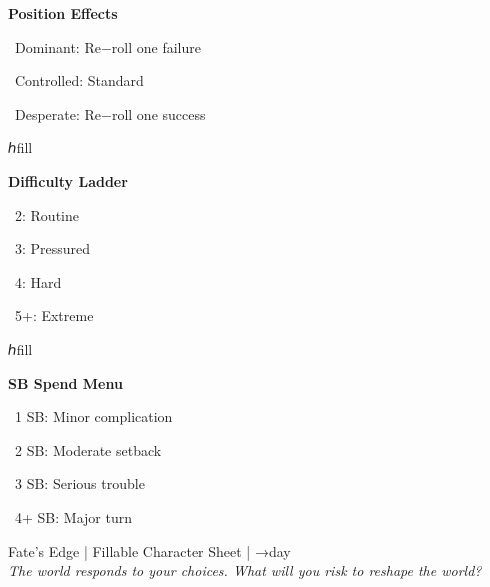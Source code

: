 \documentclass[10pt]{article}
\begin{document}
\begin{minipage}[t]{0.32\textwidth}
  \textbf{Position Effects}
  
  \textbullet~Dominant: Re−roll one failure
  
  \textbullet~Controlled: Standard
  
  \textbullet~Desperate: Re−roll one success
\end{minipage}
ℎfill
\begin{minipage}[t]{0.32\textwidth}
  \textbf{Difficulty Ladder}
  
  \textbullet~2: Routine
  
  \textbullet~3: Pressured
  
  \textbullet~4: Hard
  
  \textbullet~5+: Extreme
\end{minipage}
ℎfill
\begin{minipage}[t]{0.32\textwidth}
  \textbf{SB Spend Menu}
  
  \textbullet~1 SB: Minor complication
  
  \textbullet~2 SB: Moderate setback
  
  \textbullet~3 SB: Serious trouble
  
  \textbullet~4+ SB: Major turn
\end{minipage}

\vspace{0.5cm}

\begin{center}
  \small
  \textcolor{fateblue}{Fate's Edge} | Fillable Character Sheet | →day \\
  \textit{The world responds to your choices. What will you risk to reshape the world?}
\end{center}
\end{document}
